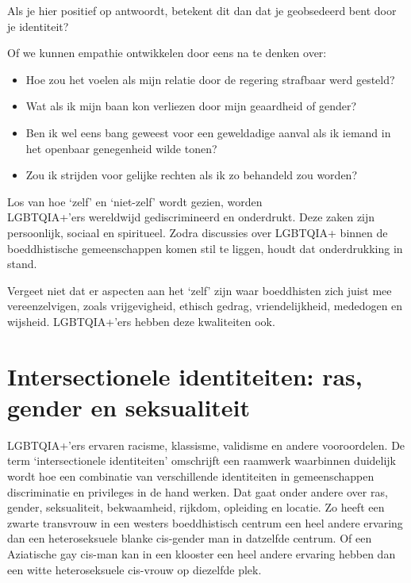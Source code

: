 \documentclass[12pt,openany]{book}
\begin{document}
Als je hier positief op antwoordt, betekent dit dan dat je geobsedeerd bent door je identiteit?

Of we kunnen empathie ontwikkelen door eens na te denken over:

\begin{itemize}
\setlength\itemsep{-0.3em}
\item Hoe zou het voelen als mijn relatie door de regering strafbaar werd gesteld?
\item Wat als ik mijn baan kon verliezen door mijn geaardheid of gender?
\item Ben ik wel eens bang geweest voor een geweldadige aanval als ik iemand in het openbaar genegenheid wilde tonen?
\item Zou ik strijden voor gelijke rechten als ik zo behandeld zou worden?
\end{itemize}

Los van hoe `zelf' en `niet-zelf' wordt gezien, worden \\ \noindent \mbox{LGBTQIA+'ers} wereldwijd gediscrimineerd en onderdrukt. Deze zaken zijn persoonlijk, sociaal en spiritueel. Zodra discussies over LGBTQIA+ binnen de boeddhistische gemeenschappen komen stil te liggen, houdt dat onderdrukking in stand.

Vergeet niet dat er aspecten aan het `zelf' zijn waar boeddhisten zich juist mee vereenzelvigen, zoals vrijgevigheid, ethisch gedrag, vriendelijkheid, mededogen en wijsheid. LGBTQIA+'ers hebben deze kwaliteiten ook.

\section*{Intersectionele identiteiten: ras, gender en seksualiteit}

LGBTQIA+'ers ervaren racisme, klassisme, validisme en andere vooroordelen. De term `intersectionele identiteiten' omschrijft een raamwerk waarbinnen duidelijk wordt hoe een combinatie van verschillende identiteiten in gemeenschappen discriminatie en privileges in de hand werken. Dat gaat onder andere over ras, gender, seksualiteit, bekwaamheid, rijkdom, opleiding en locatie. Zo heeft een zwarte transvrouw in een westers boeddhistisch centrum een heel andere ervaring dan een heteroseksuele blanke cis-gender man in datzelfde centrum. Of een Aziatische gay cis-man kan in een klooster een heel andere ervaring hebben dan een witte heteroseksuele cis-vrouw op diezelfde plek.
\end{document}
